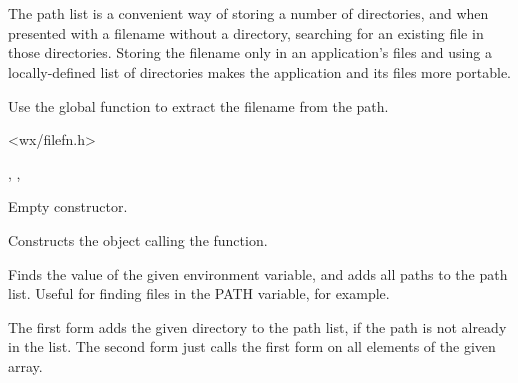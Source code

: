 \section{}\label{wxpathlist}

The path list is a convenient way of storing a number of directories, and
when presented with a filename without a directory, searching for an existing file
in those directories.  Storing the filename only in an application's files and
using a locally-defined list of directories makes the application and its files more
portable.

Use the  global function 
to extract the filename from the path.




<wx/filefn.h>


, , 



\label{wxpathlistctor}


Empty constructor.


Constructs the object calling the  function.


\label{wxpathlistaddenvlist}


Finds the value of the given environment variable, and adds all paths
to the path list. Useful for finding files in the PATH variable, for
example.


\label{wxpathlistadd}



The first form adds the given directory to the path list, if the path is not already in the list.
The second form just calls the first form on all elements of the given array.

